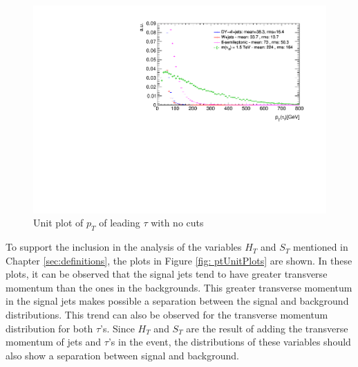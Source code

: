 \begin{figure}
\centering
\includegraphics[width=\linewidth]{Plots/tau1_pt_unitNC.pdf}
\caption{Unit plot of $p_{T}$ of leading $\tau$ with no cuts}
\label{fig: tau1ptunitNC}
\end{figure}

To support the inclusion in the analysis of the variables $H_{T}$ and $S_{T}$ mentioned in Chapter \ref{sec:definitions}, the plots in Figure \ref{fig: ptUnitPlots} are shown. In these plots, it can be observed that the signal jets tend to have greater transverse momentum than the ones in the backgrounds. This greater transverse momentum in the signal jets makes possible a separation between the signal and background distributions. This trend can also be observed for the transverse momentum distribution for both $\tau$'s. Since $H_{T}$ and $S_{T}$ are the result of adding the transverse momentum of jets and $\tau$'s in the event, the distributions of these variables should also show a separation between signal and background.

